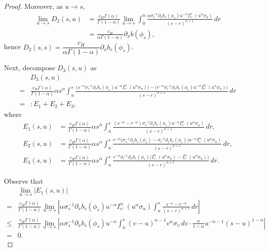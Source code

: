 \documentclass[preprint,12pt]{elsarticle}
\theoremstyle{definition}  %
\theoremstyle{plain}  %
\begin{document}
\begin{proof}
Moreover, as $u\to s$,
\begin{align*}
	\lim_{u\to s}D_2(s,u)
	&= \frac{c_H\Gamma(\alpha)}{\Gamma(1-\alpha)}\lim_{u\to s}\int_0^u \frac{\alpha \sigma_s^{-1}\partial_x b_s(\phi_s)u^{-\alpha}I_{s^-}^\alpha (u^\alpha \sigma_u)}{(s-r)^{\alpha+1}}\,dr\\
	&= \frac{c_H}{\alpha\Gamma(1-\alpha)}\partial_x b(\phi_s),
\end{align*}
hence $D_2(s,s)=\dfrac{c_H}{\alpha\Gamma(1-\alpha)}\partial_x b_s
(\phi_s)$.

Next, decompose $D_3(s,u)$ as
\begin{align*}
	& D_3(s,u)\\ 
    =& \frac{c_H\Gamma(\alpha)}{\Gamma(1-\alpha)} \alpha s^\alpha\int_u^s \frac{ 
	\big(s^{-\alpha}\sigma_s^{-1}\partial_x b_s(\phi_s)u^{-\alpha}I_{s^-}^\alpha (u^\alpha\sigma_u)\big) - \big(r^{-\alpha}\sigma_r^{-1}\partial_x b_r(\phi_r)u^{-\alpha}I_{r^-}^\alpha (u^\alpha\sigma_u)\big)}
		{(s-r)^{\alpha+1}}\,dr \\
		=&: E_1+E_2+E_3,
\end{align*}
where
\begin{align*}
	E_1(s,u)&=\frac{c_H\Gamma(\alpha)}{\Gamma(1-\alpha)} \alpha s^\alpha\int_u^s \frac{ (s^{-\alpha}- r^{-\alpha})\sigma_s^{-1}\partial_x b_s(\phi_s)u^{-\alpha}I_{s^-}^\alpha (u^\alpha \sigma_u)}
		{(s-r)^{\alpha+1}}\,dr,\\
    E_2(s,u)&=\frac{c_H\Gamma(\alpha)}{\Gamma(1-\alpha)} \alpha s^\alpha\int_u^s \frac{ r^{-\alpha}\big(\sigma_s^{-1}\partial_x b_s(\phi_s)-\sigma_r^{-1}\partial_x b_r(\phi_r)\big)u^{-\alpha}I_{s^-}^\alpha (u^\alpha \sigma_u)}
		{(s-r)^{\alpha+1}}\,dr,\\
    E_3(s,u)&=\frac{c_H\Gamma(\alpha)}{\Gamma(1-\alpha)} \alpha s^\alpha\int_u^s \frac{ r^{-\alpha}\sigma_r^{-1}\partial_x b_r(\phi_r)\big(I_{s^-}^\alpha (u^\alpha\sigma_u)- I_{r^-}^\alpha (u^\alpha\sigma_u)\big)}
		{(s-r)^{\alpha+1}}\,dr.
\end{align*}

Observe that
\begin{align*}
    &\lim_{u\to s} \left|E_1(s,u)\right|\\
    =&\frac{c_H\Gamma(\alpha)}{\Gamma(1-\alpha)}\lim_{u\to s}\left| \alpha  \sigma_s^{-1}\partial_x b_s(\phi_s)u^{-\alpha}I_{s^-}^\alpha (u^\alpha\sigma_u)\int_u^s \frac{ s^{-\alpha}- r^{-\alpha}}{(s-r)^{\alpha+1}}\,dr\right|\\
    \leq & \frac{c_H\Gamma(\alpha)}{\Gamma(1-\alpha)}\lim_{u\to s} \left|\alpha  \sigma_s^{-1}\partial_x b_s(\phi_s)u^{-\alpha}\int_u^s (v-u)^{\alpha-1}v^\alpha\sigma_v\,dv\cdot \frac{\alpha}{1-\alpha}u^{-\alpha-1}(s-u)^{1-\alpha}\right| \\
   =&0.
\end{align*}


\end{proof}
\end{document}
